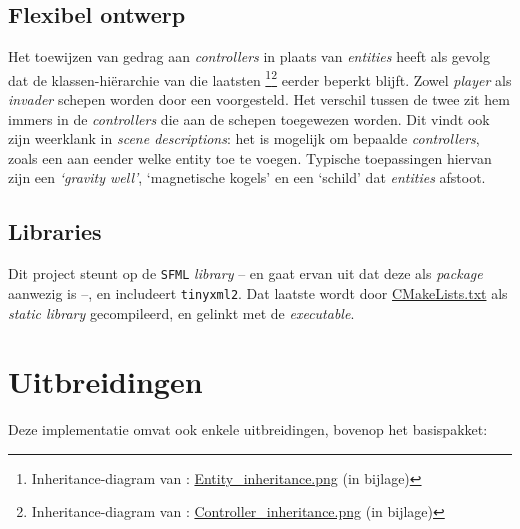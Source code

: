 \documentclass[10pt,a4paper]{article}
\begin{document}
\subsection{Flexibel ontwerp}
Het toewijzen van gedrag aan \emph{controllers} in plaats van 
\emph{entities} heeft als gevolg dat de klassen-hi\"erarchie van 
die laatsten
\footnote{Inheritance-diagram van : \url{Entity_inheritance.png} (in bijlage)}\footnote{Inheritance-diagram van : \url{Controller_inheritance.png} (in bijlage)}
 eerder beperkt blijft. Zowel \emph{player} als \emph{invader}
schepen worden door een  voorgesteld. 
Het verschil tussen de twee zit hem immers in de \emph{controllers} die aan 
de schepen toegewezen worden. Dit vindt ook zijn weerklank in 
\emph{scene descriptions}: het is mogelijk om bepaalde \emph{controllers}, 
zoals een  aan eender welke entity toe te 
voegen. Typische toepassingen hiervan zijn een 
\emph{`gravity well'}, `magnetische kogels' en een `schild' dat 
\emph{entities} afstoot.

\subsection{Libraries}
Dit project steunt op de \texttt{SFML} \emph{library} -- en gaat ervan uit
dat deze als \emph{package} aanwezig is --, en includeert 
\texttt{tinyxml2}. Dat laatste wordt door \url{CMakeLists.txt} als 
\emph{static library} gecompileerd, en gelinkt met de \emph{executable}.

\section{Uitbreidingen}

Deze implementatie omvat ook enkele uitbreidingen, bovenop het basispakket:
\end{document}
